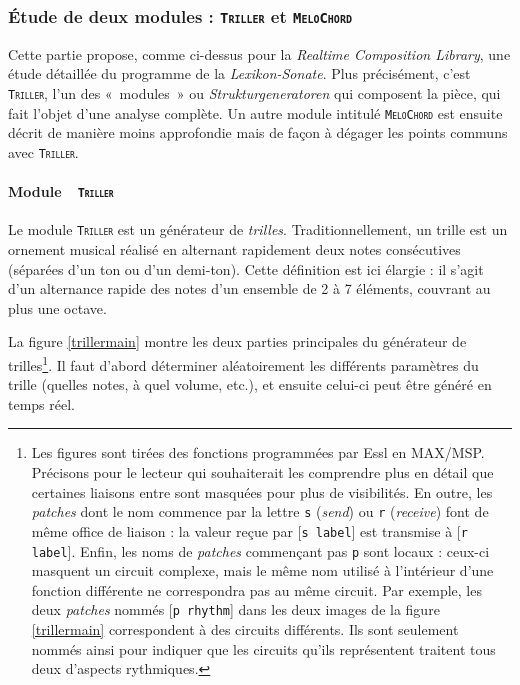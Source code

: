 \documentclass[a4paper,12pt]{article}
\newcommand{\guill}[1]{«~#1~»}
\newcommand{\module}[1]{\texttt{\textsc{#1}}}
\newcommand{\patch}[1]{[\texttt{#1}]}
\begin{document}
\subsubsection{Étude de deux modules : \textnormal{\module{Triller}} et \textnormal{\module{MeloChord}}}
\label{lsmodules}

Cette partie propose, comme ci-dessus pour la \emph{Realtime Composition Library}, une étude détaillée du programme de la \emph{Lexikon-Sonate}. Plus précisément, c'est \module{Triller}, l'un des \guill{modules} ou \emph{Strukturgeneratoren} qui composent la pièce, qui fait l'objet d'une analyse complète. Un autre module intitulé \module{MeloChord} est ensuite décrit de manière moins approfondie mais de façon à dégager les points communs avec \module{Triller}.

\paragraph{Module~~\textnormal{\module{Triller}} \\}

Le module \module{Triller} est un générateur de \emph{trilles}. Traditionnellement, un trille est un ornement musical réalisé en alternant rapidement deux notes consécutives (séparées d'un ton ou d'un demi-ton). Cette définition est ici élargie : il s'agit d'un alternance rapide des notes d'un ensemble de 2 à 7 éléments, couvrant au plus une octave.

La figure \ref{trillermain} montre les deux parties principales du générateur de trilles\footnote{Les figures sont tirées des fonctions programmées par Essl en MAX/MSP. Précisons pour le lecteur qui souhaiterait les comprendre plus en détail que certaines liaisons entre sont masquées pour plus de visibilités. En outre, les \emph{patches} dont le nom commence par la lettre \texttt{s} (\emph{send}) ou \texttt{r} (\emph{receive}) font de même office de liaison : la valeur reçue par \patch{s label} est transmise à \patch{r label}. Enfin, les noms de \emph{patches} commençant pas \texttt{p} sont locaux : ceux-ci masquent un circuit complexe, mais le même nom utilisé à l'intérieur d'une fonction différente ne correspondra pas au même circuit. Par exemple, les deux \emph{patches} nommés \patch{p rhythm} dans les deux images de la figure \ref{trillermain} correspondent à des circuits différents. Ils sont seulement nommés ainsi pour indiquer que les circuits qu'ils représentent traitent tous deux d'aspects rythmiques.}. Il faut d'abord déterminer aléatoirement les différents paramètres du trille (quelles notes, à quel volume, etc.), et ensuite celui-ci peut être généré en temps réel.
\end{document}
